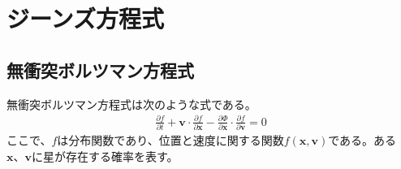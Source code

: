 

\section{ジーンズ方程式 \label{sec_JeansEq}}
\subsection{無衝突ボルツマン方程式}
無衝突ボルツマン方程式は次のような式である。
\begin{align}
	\frac{\partial f}{\partial t} + \bm{v} \cdot \frac{\partial f}{\partial \bm{x}} - \frac{\partial \Phi}{\partial \bm{x}} \cdot \frac{\partial f}{\partial \bm{v}} = 0 \label{CBE}
\end{align}
ここで、$f$は分布関数であり、位置と速度に関する関数$f(\pmb{x},\pmb{v})$である。ある$\pmb{x}、\pmb{v}$に星が存在する確率を表す。

